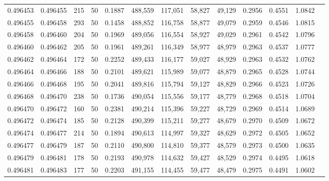 \begin{tabular}{rrrrrrrrrrrrr}
0.496453 & 0.496455 &   215 &  50 &                                     0.1887 & 488,559 & 117,051 &  58,827 &  49,129 & 0.2956 & 0.4551 & 1.0842 \\
0.496455 & 0.496458 &   293 &  50 &                                     0.1458 & 488,852 & 116,758 &  58,877 &  49,079 & 0.2959 & 0.4546 & 1.0815 \\
0.496458 & 0.496460 &   204 &  50 &                                     0.1969 & 489,056 & 116,554 &  58,927 &  49,029 & 0.2961 & 0.4542 & 1.0796 \\
0.496460 & 0.496462 &   205 &  50 &                                     0.1961 & 489,261 & 116,349 &  58,977 &  48,979 & 0.2963 & 0.4537 & 1.0777 \\
0.496462 & 0.496464 &   172 &  50 &                                     0.2252 & 489,433 & 116,177 &  59,027 &  48,929 & 0.2963 & 0.4532 & 1.0762 \\
0.496464 & 0.496466 &   188 &  50 &                                     0.2101 & 489,621 & 115,989 &  59,077 &  48,879 & 0.2965 & 0.4528 & 1.0744 \\
0.496466 & 0.496468 &   195 &  50 &                                     0.2041 & 489,816 & 115,794 &  59,127 &  48,829 & 0.2966 & 0.4523 & 1.0726 \\
0.496468 & 0.496470 &   238 &  50 &                                     0.1736 & 490,054 & 115,556 &  59,177 &  48,779 & 0.2968 & 0.4518 & 1.0704 \\
0.496470 & 0.496472 &   160 &  50 &                                     0.2381 & 490,214 & 115,396 &  59,227 &  48,729 & 0.2969 & 0.4514 & 1.0689 \\
0.496472 & 0.496474 &   185 &  50 &                                     0.2128 & 490,399 & 115,211 &  59,277 &  48,679 & 0.2970 & 0.4509 & 1.0672 \\
0.496474 & 0.496477 &   214 &  50 &                                     0.1894 & 490,613 & 114,997 &  59,327 &  48,629 & 0.2972 & 0.4505 & 1.0652 \\
0.496477 & 0.496479 &   187 &  50 &                                     0.2110 & 490,800 & 114,810 &  59,377 &  48,579 & 0.2973 & 0.4500 & 1.0635 \\
0.496479 & 0.496481 &   178 &  50 &                                     0.2193 & 490,978 & 114,632 &  59,427 &  48,529 & 0.2974 & 0.4495 & 1.0618 \\
0.496481 & 0.496483 &   177 &  50 &                                     0.2203 & 491,155 & 114,455 &  59,477 &  48,479 & 0.2975 & 0.4491 & 1.0602 \\

\end{tabular}
